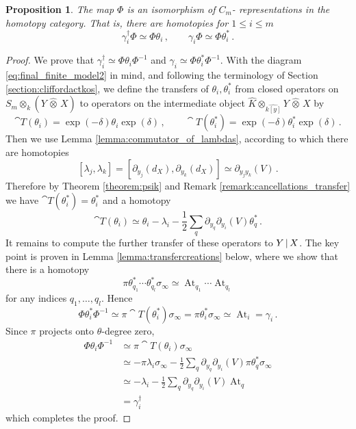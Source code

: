 \documentclass[english,letter paper,12pt,leqno]{article}
\newtheorem{proposition}[theorem]{Proposition}
\theoremstyle{example}
\numberwithin{equation}{section}
\def\be{\begin{equation}}
\def\ee{\end{equation}}
\def\ferm{\gamma}
\def\fermc{\gamma^\dagger}
\DeclareMathOperator{\At}{At}
\begin{document}
\begin{proposition}\label{prop:clifford_action} The map $\Phi$ is an isomorphism of $C_m$- representations in the homotopy category. That is, there are homotopies for $1 \le i \le m$
\[
\fermc_i \Phi \simeq \Phi \theta_i \,, \qquad \ferm_i \Phi \simeq \Phi \theta_i^*\,.
\]
\end{proposition}
\begin{proof}
We prove that $\fermc_i \simeq \Phi \theta_i \Phi^{-1}$ and $\ferm_i \simeq \Phi \theta_i^* \Phi^{-1}$. With the diagram \eqref{eq:final_finite_model2} in mind, and following the terminology of Section \ref{section:cliffordactkos}, we define the transfers of $\theta_i, \theta_i^*$ from closed operators on $S_m \otimes_k ( Y \,\widehat{\otimes}\, X )$ to operators on the intermediate object $\widehat{K} \otimes_{\widehat{k[y]}} Y \,\widehat{\otimes}\, X$ by
\[
\cat{T}(\theta_i) = \exp(-\delta) \theta_i \exp(\delta)\,, \qquad \cat{T}(\theta_i^*) = \exp(-\delta) \theta_i^* \exp(\delta)\,.
\]
Then we use Lemma \ref{lemma:commutator_of_lambdas}, according to which there are homotopies
\[
[ \lambda_j, \lambda_k ] = [ \partial_{y_j}(d_X), \partial_{y_k}(d_X) ] \simeq \partial_{y_jy_k}(V)\,.
\]
Therefore by Theorem \ref{theorem:psik} and Remark \ref{remark:cancellations_transfer} we have $\cat{T}(\theta_i^*) = \theta_i^*$ and a homotopy
\be\label{eq:comp338h}
\cat{T}(\theta_i) \simeq \theta_i - \lambda_i - \frac{1}{2}\sum_q \partial_{y_q} \partial_{y_i}(V) \theta_q^*\,.
\ee
It remains to compute the further transfer of these operators to $Y \,|\, X$. The key point is proven in Lemma \ref{lemma:transfercreations} below, where we show that there is a homotopy
\be\label{eq:transfercr}
\pi \theta_{q_1}^* \cdots \theta_{q_l}^* \sigma_\infty \simeq \At_{q_1} \cdots \At_{q_l}
\ee
for any indices $q_1,\ldots,q_l$. Hence
\[
\Phi \theta_i^* \Phi^{-1} \simeq \pi \cat{T}(\theta_i^*) \sigma_\infty = \pi \theta_i^* \sigma_\infty \simeq \At_i = \ferm_i\,.
\]
Since $\pi$ projects onto $\theta$-degree zero,
\begin{align*}
\Phi \theta_i \Phi^{-1} &\simeq \pi \cat{T}(\theta_i) \sigma_\infty\\
&\simeq - \pi \lambda_i \sigma_\infty - \frac{1}{2} \sum_q \partial_{y_q} \partial_{y_i}(V) \pi \theta_q^* \sigma_\infty\\
&\simeq - \lambda_i - \frac{1}{2}\sum_q \partial_{y_q} \partial_{y_i}(V) \At_q\\
&= \fermc_i
\end{align*}
which completes the proof.
\end{proof}
\end{document}
